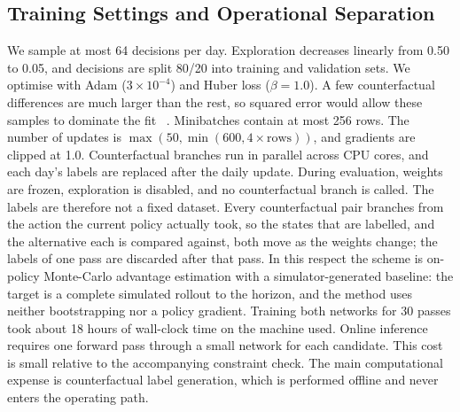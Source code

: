 \subsection{Training Settings and Operational Separation}
\label{sec:arch-train}
We sample at most 64 decisions per day. Exploration decreases linearly
from 0.50 to 0.05, and decisions are split 80/20 into training and
validation sets. We optimise with Adam ($3\times10^{-4}$) and Huber loss
($\beta=1.0$). A few counterfactual differences are much larger than the
rest, so squared error would allow these samples to dominate the fit
~\cite{refhuber}. Minibatches contain at most 256 rows. The number of
updates is $\max(50,\min(600,4\times\text{rows}))$, and gradients are
clipped at 1.0. Counterfactual branches run in parallel across CPU cores,
and each day's labels are replaced after the daily update. During
evaluation, weights are frozen, exploration is disabled, and no
counterfactual branch is called.
The labels are therefore not a fixed dataset. Every counterfactual pair
branches from the action the current policy actually took, so the states
that are labelled, and the alternative each is compared against, both
move as the weights change; the labels of one pass are discarded after
that pass. In this respect the scheme is on-policy Monte-Carlo advantage
estimation with a simulator-generated baseline: the target is a complete
simulated rollout to the horizon, and the method uses neither
bootstrapping nor a policy gradient.
Training both networks for 30 passes took about 18 hours of wall-clock time on the machine used. Online
inference requires one forward pass through a small network for each
candidate. This cost is small relative to the accompanying constraint
check. The main computational expense is counterfactual label
generation, which is performed offline and never enters the operating
path.
